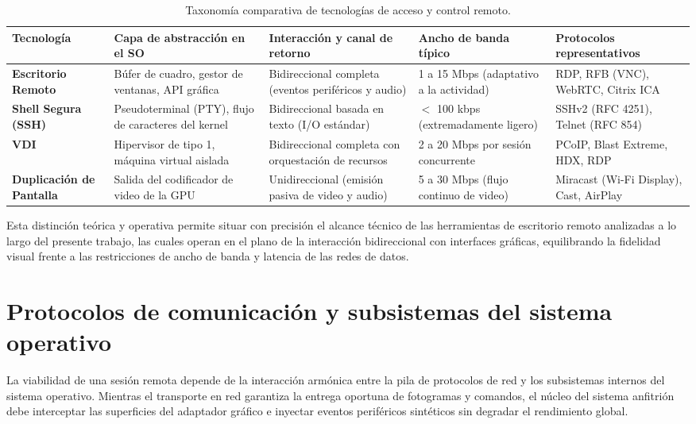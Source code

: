 \documentclass[12pt]{article}
\begin{document}
\begin{table}[htbp]
\centering
\small
\renewcommand{\arraystretch}{1.15}
\renewcommand{\tabularxcolumn}[1]{m{#1}}
\setlength{\emergencystretch}{1.5em}
\caption{Taxonomía comparativa de tecnologías de acceso y control remoto.}
\label{tab:comparativaTecnologiasRemotas}
\begin{tabularx}{\textwidth}{>{\centering\arraybackslash}m{2.6cm} X X X X}
\toprule
\textbf{Tecnología} & \textbf{Capa de abstracción en el SO} & \textbf{Interacción y canal de retorno} & \textbf{Ancho de banda típico} & \textbf{Protocolos representativos} \\
\midrule
\textbf{Escritorio Remoto} & Búfer de cuadro, gestor de ventanas, API gráfica & Bidireccional completa (eventos periféricos y audio) & 1 a 15 Mbps (adaptativo a la actividad) & RDP, RFB (VNC), WebRTC, Citrix ICA \\
\textbf{Shell Segura (SSH)} & Pseudoterminal (PTY), flujo de caracteres del kernel & Bidireccional basada en texto (I/O estándar) & $<$ 100 kbps (extremadamente ligero) & SSHv2 (RFC 4251), Telnet (RFC 854) \\
\textbf{VDI} & Hipervisor de tipo 1, máquina virtual aislada & Bidireccional completa con orquestación de recursos & 2 a 20 Mbps por sesión concurrente & PCoIP, Blast Extreme, HDX, RDP \\
\textbf{Duplicación de Pantalla} & Salida del codificador de video de la GPU & Unidireccional (emisión pasiva de video y audio) & 5 a 30 Mbps (flujo continuo de video) & Miracast (Wi-Fi Display), Cast, AirPlay \\
\bottomrule
\end{tabularx}
\end{table}

Esta distinción teórica y operativa permite situar con precisión el alcance técnico de las herramientas de escritorio remoto analizadas a lo largo del presente trabajo, las cuales operan en el plano de la interacción bidireccional con interfaces gráficas, equilibrando la fidelidad visual frente a las restricciones de ancho de banda y latencia de las redes de datos.

\section{Protocolos de comunicación y subsistemas del sistema operativo}\label{sec:protocolosSubsistemas}

La viabilidad de una sesión remota depende de la interacción armónica entre la pila de protocolos de red y los subsistemas internos del sistema operativo. Mientras el transporte en red garantiza la entrega oportuna de fotogramas y comandos, el núcleo del sistema anfitrión debe interceptar las superficies del adaptador gráfico e inyectar eventos periféricos sintéticos sin degradar el rendimiento global.
\end{document}
